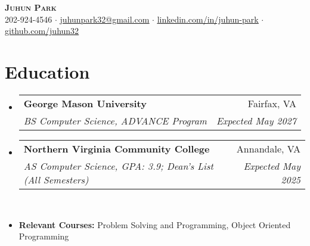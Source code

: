 \documentclass[letterpaper,11pt]{article}
\makeatletter
\newcommand{\resumeItem}[1]{
  \item\small{
    {#1 \vspace{-3pt}}
  }
}
\newcommand{\resumeSubheading}[4]{
  \vspace{-2pt}\item
    \begin{tabular*}{0.97\textwidth}[t]{l@{\extracolsep{\fill}}r@{\hspace{-0.2in}}}
        \textbf{#1} & #2 \\
        \textit{\small#3} & \textit{\small #4} \\
    \end{tabular*}\vspace{-1pt}
}
\newcommand{\resumeSubHeadingListStart}{\begin{itemize}[leftmargin=0.00in, rightmargin=-0.2in, label={}]}
\newcommand{\resumeSubHeadingListEnd}{\end{itemize}}
\makeatother
\begin{document}

\begin{center}
    \textbf{\Huge \scshape {Juhun Park}} \\ \vspace{1pt}
    \small 202-924-4546 $\cdot$ 
    \href{mailto:riann3207@gmail.com}{\underline{juhunpark32@gmail.com}} $\cdot$
    \href{https://linkedin.com/in/juhun-park}{\underline{linkedin.com/in/juhun-park}} $\cdot$
    \href{https://github.com/juhun32}{\underline{github.com/juhun32}} \\
\end{center}


\section{Education}
    \resumeSubHeadingListStart
        \resumeSubheading
            {George Mason University}{Fairfax, VA}
            {BS Computer Science, ADVANCE Program}{Expected May 2027}

        \resumeSubheading
            {Northern Virginia Community College}{Annandale, VA}
            {AS Computer Science, GPA: 3.9; Dean's List (All Semesters)}{Expected May 2025} \\
        
        \resumeItem{\textbf{Relevant Courses: }{Problem Solving and Programming, Object Oriented Programming}}
    \resumeSubHeadingListEnd

\end{document}

